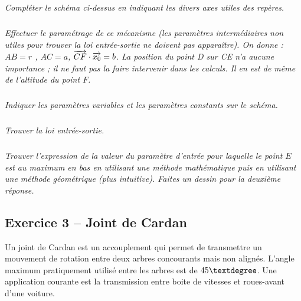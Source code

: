 \documentclass[10pt,fleqn]{article} %
\begin{document}
\begin{multicols}{2}
\subparagraph{}
\textit{Compléter le schéma ci-dessus en indiquant les divers axes utiles des repères.}


\ifprof
\begin{corrige}
\end{corrige}
\else \fi


\subparagraph{}
\textit{Effectuer le paramétrage de ce mécanisme (les paramètres intermédiaires non utiles pour trouver la loi entrée-sortie ne doivent pas apparaître). On donne : $AB = r$ , $AC = a$, $\overrightarrow{CF}\cdot\overrightarrow{x_0}=b$. La position du point D sur CE n'a aucune importance ; il ne faut pas la faire intervenir dans les calculs. Il en est de même de l'altitude du point $F$.}


\ifprof
\begin{corrige}
\end{corrige}
\else \fi


\subparagraph{}
\textit{Indiquer les paramètres variables et les paramètres constants sur le schéma.}


\ifprof
\begin{corrige}
\end{corrige}
\else \fi


\subparagraph{}
\textit{Trouver la loi entrée-sortie. }


\ifprof
\begin{corrige}
\end{corrige}
\else \fi


\subparagraph{}
\textit{Trouver l'expression de la valeur du paramètre d'entrée pour laquelle le point $E$ est au maximum en bas en utilisant une méthode mathématique puis en utilisant une méthode géométrique (plus intuitive). Faites un dessin pour la deuxième réponse.}


\ifprof
\begin{corrige}
\end{corrige}
\else \fi

\newpage

\subsection*{Exercice 3 -- Joint de Cardan}
\setcounter{exo}{0}


Un joint de Cardan est un accouplement qui permet de transmettre un mouvement de rotation entre deux arbres concourants mais non alignés. L'angle maximum pratiquement utilisé entre les arbres est de $45\textdegree$. Une application courante est la transmission entre boite de vitesses  et roues-avant d’une voiture. 


\end{multicols}
\end{document}
